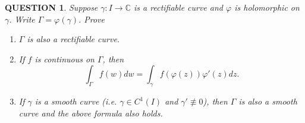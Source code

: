\documentclass[12pt]{article}
\renewcommand{\(}{\left(}%
\renewcommand{\)}{\right)}%
\renewcommand{\[}{\left[}%
\renewcommand{\]}{\right]}%
\renewcommand{\c}{\mathbb{C}}
\newtheorem{question}{QUESTION}[section]}
\begin{document}
 \begin{question}
 	Suppose $\gamma: I\to\c$ is a rectifiable curve and $\varphi$ is holomorphic on $\gamma$. Write $\Gamma=\varphi(\gamma)$. Prove 
 	\begin{enumerate}
 		\item $\Gamma$ is also a rectifiable curve. 
 		\item If $f$ is continuous on $\Gamma$, then
 		\begin{equation*}
 			\int_\Gamma f(w)dw=\int_\gamma f(\varphi(z))\varphi'(z)dz.
 		\end{equation*}
 		\item If $\gamma$ is a smooth curve (i.e. $\gamma\in C^1(I)$ and $\gamma'\not\equiv 0$), then $\Gamma$ is also a smooth curve and the above formula also holds.
 	\end{enumerate}
 \end{question}
\end{document}
